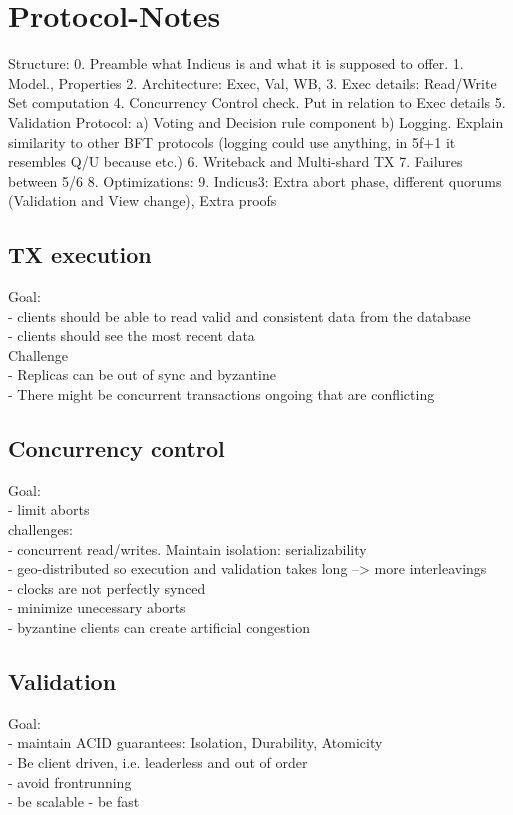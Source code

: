 \section{Protocol-Notes}

Structure:
0. Preamble what Indicus is and what it is supposed to offer.
1. Model., Properties   
2. Architecture: Exec, Val, WB, 
3. Exec details: Read/Write Set computation
4. Concurrency Control check. Put in relation to Exec details
5. Validation Protocol: a) Voting and Decision rule component b) Logging. Explain similarity to other BFT protocols (logging could use anything, in 5f+1 it resembles Q/U because etc.)
6. Writeback and Multi-shard TX
7. Failures between 5/6
8. Optimizations: 
9. Indicus3: Extra abort phase, different quorums (Validation and View change), Extra proofs

\subsection{TX execution}
Goal:\\
- clients should be able to read valid and consistent data from the database\\
- clients should see the most recent data\\


Challenge\\
- Replicas can be out of sync and byzantine\\
- There might be concurrent transactions ongoing that are conflicting\\



\subsection{Concurrency control}
Goal: \\
- limit aborts\\

challenges:\\
- concurrent read/writes. Maintain isolation: serializability\\
- geo-distributed so execution and validation takes long --> more interleavings\\
- clocks are not perfectly synced\\
- minimize unecessary aborts\\
- byzantine clients can create artificial congestion\\


\subsection{Validation}
Goal:\\
- maintain ACID guarantees: Isolation, Durability, Atomicity\\
- Be client driven, i.e. leaderless and out of order\\
- avoid frontrunning\\
- be scalable
- be fast


